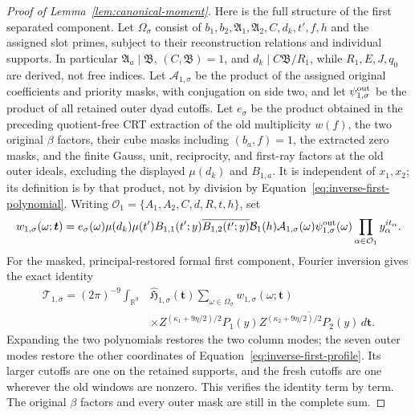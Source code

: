 \documentclass[11pt,a4paper]{article}
\numberwithin{equation}{section}
\numberwithin{figure}{section}
\theoremstyle{definition}
\theoremstyle{remark}
\begin{document}
\begin{proof}[Proof of Lemma~\ref{lem:canonical-moment}]
Here is the full structure of the first separated component.  Let
\(\Omega_\sigma\) consist of
\(b_1,b_2,\mathfrak A_1,\mathfrak A_2,C,d_k,t',f,h\) and the assigned
slot primes, subject to their reconstruction relations and individual
supports.  In particular
\(\mathfrak A_a\mid\mathfrak B\), \((C,\mathfrak B)=1\), and
\(d_k\mid C\mathfrak B/R_1\), while \(R_1,E,J,q_0\) are derived,
not free indices.
Let \(\mathcal A_{1,\sigma}\) be the product of the assigned original
coefficients and priority masks, with conjugation on side two, and let
\(\psi_{1,\sigma}^{\rm out}\) be the product of all retained outer
dyad cutoffs.  Let \(e_\sigma\) be the product obtained in the preceding
quotient-free CRT extraction of the old multiplicity \(w(f)\), the two original
\(\beta\) factors, their cube masks including \((b_a,f)=1\), the
extracted zero masks, and the
finite Gauss, unit, reciprocity, and first-ray factors at the old outer
ideals, excluding the displayed \(\mu(d_k)\) and \(B_{1,a}\).
It is independent of \(x_1,x_2\); its definition is by that product,
not by division by Equation~\eqref{eq:inverse-first-polynomial}.
Writing \(\mathcal O_1=\{A_1,A_2,C,d,R,t,h\}\), set
\[
 w_{1,\sigma}(\omega;\boldsymbol t)
 =e_\sigma(\omega)\mu(d_k)\mu(t')B_{1,1}(t';y)
       \overline{B_{1,2}(t';y)}\mathcal B_1(h)
       \mathcal A_{1,\sigma}(\omega)\psi_{1,\sigma}^{\rm out}(\omega)
       \prod_{\alpha\in\mathcal O_1}y_\alpha^{it_\alpha}.
\]
For the masked, principal-restored formal first component, Fourier
inversion gives the exact identity
\begin{equation}\label{eq:inverse-first-separated}
 \begin{split}
 \mathcal T_{1,\sigma}=(2\pi)^{-9}\int_{\mathbb R^9}
 &\widehat{\mathfrak H}_{1,\sigma}(\boldsymbol t)
 \sum_{\omega\in\Omega_\sigma}w_{1,\sigma}(\omega;\boldsymbol t)\\
 &\times Z^{(\kappa_1+9\eta/2)/2}P_1(y)
       \overline{Z^{(\kappa_2+9\eta/2)/2}P_2(y)}\,d\boldsymbol t.
 \end{split}
\end{equation}
Expanding the two polynomials restores the two column modes; the seven
outer modes restore the other coordinates of
Equation~\eqref{eq:inverse-first-profile}.  Its larger cutoffs are one
on the retained supports, and the fresh cutoffs are one wherever the
old windows are nonzero.  This verifies the identity term by term.
The original \(\beta\) factors and every outer mask are still in the
complete sum.


\end{proof}
\end{document}
